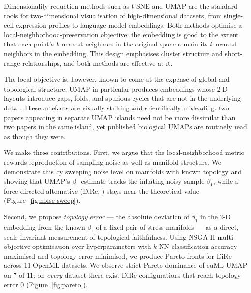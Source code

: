 \documentclass[9pt,twocolumn,twoside]{pnas-new}
\providecommand{\Firstpage}{}
\begin{document}

\maketitle
\thispagestyle{firststyle}

\Firstpage
\label{sec:intro}

Dimensionality reduction methods such as t-SNE \citep{tsne} and UMAP
\citep{umap} are the standard tools for two-dimensional visualisation of
high-dimensional datasets, from single-cell expression profiles to language
model embeddings. Both methods optimise a local-neighborhood-preservation
objective: the embedding is good to the extent that each point's $k$
nearest neighbors in the original space remain its $k$ nearest neighbors
in the embedding. This design emphasises cluster structure and short-range
relationships, and both methods are effective at it.

The local objective is, however, known to come at the expense of global
and topological structure. UMAP in particular produces embeddings whose
2-D layouts introduce gaps, folds, and spurious cycles that are not in
the underlying data \citep{pachter,chari-pachter-2023}. These artefacts
are visually striking and scientifically misleading: two papers appearing
in separate UMAP islands need not be more dissimilar than two papers in
the same island, yet published biological UMAPs are routinely read as
though they were.

We make three contributions. First, we argue that the local-neighborhood
metric rewards reproduction of sampling noise as well as manifold
structure. We demonstrate this by sweeping noise level on manifolds with
known topology and showing that UMAP's $\beta_1$ estimate tracks the
inflating noisy-sample $\beta_1$, while a force-directed alternative
(DiRe, \citep{dire-joss}) stays near the theoretical value
(Figure~\ref{fig:noise-sweep}).

Second, we propose \emph{topology error} --- the absolute deviation of
$\beta_1$ in the 2-D embedding from the known $\beta_1$ of a fixed pair
of stress manifolds --- as a direct, scale-invariant measurement of
topological faithfulness. Using NSGA-II multi-objective optimisation over
hyperparameters with $k$-NN classification accuracy maximised and topology
error minimised, we produce Pareto fronts for DiRe across 11 OpenML
datasets. We observe strict Pareto dominance of cuML UMAP on 7 of 11; on
\emph{every} dataset there exist DiRe configurations that reach topology
error 0 (Figure~\ref{fig:pareto}).
\end{document}
